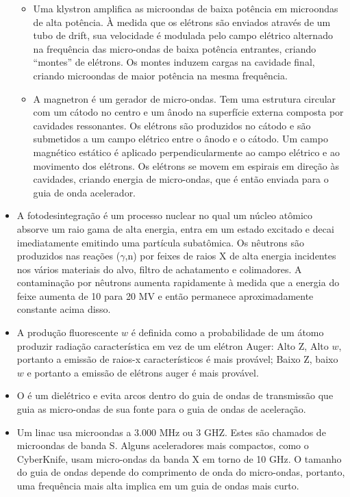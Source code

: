 \documentclass[11pt,a4paper]{article}
\newcounter{exemplo}
\begin{document}
\begin{exemplo}[Física]
\begin{itemize}
            \begin{itemize}
                \item Uma klystron amplifica as microondas de baixa potência em microondas de alta potência. À medida que os elétrons são enviados através de um tubo de drift, sua velocidade é modulada pelo campo elétrico alternado na frequência das micro-ondas de baixa potência entrantes, criando “montes” de elétrons. Os montes induzem cargas na cavidade final, criando microondas de maior potência na mesma frequência.
                
                \item A magnetron é um gerador de micro-ondas. Tem uma estrutura circular com um cátodo no centro e um ânodo na superfície externa composta por cavidades ressonantes. Os elétrons são produzidos no cátodo e são submetidos a um campo elétrico entre o ânodo e o cátodo. Um campo magnético estático é aplicado perpendicularmente ao campo elétrico e ao movimento dos elétrons. Os elétrons se movem em espirais em direção às cavidades, criando energia de micro-ondas, que é então enviada para o guia de onda acelerador.
            \end{itemize}
        
        \item A fotodesintegração é um processo nuclear no qual um núcleo atômico absorve um raio gama de alta energia, entra em um estado excitado e decai imediatamente emitindo uma partícula subatômica. Os nêutrons são produzidos nas reações ($\gamma$,n) por feixes de raios X de alta energia incidentes nos vários materiais do alvo, filtro de achatamento e colimadores. A contaminação por nêutrons aumenta rapidamente à medida que a energia do feixe aumenta de 10 para 20 MV e então permanece aproximadamente constante acima disso.
        
        \item A produção fluorescente $w$ é definida como a probabilidade de um átomo produzir radiação característica em vez de um elétron Auger: Alto Z, Alto $w$, portanto a emissão de raios-x característicos é mais provável; Baixo Z, baixo $w$ e portanto a emissão de elétrons auger é mais provável. 
        
        \item O  é um dielétrico e evita arcos dentro do guia de ondas de transmissão que guia as micro-ondas de sua fonte para o guia de ondas de aceleração.
        
        \item Um linac usa microondas a 3.000 MHz ou 3 GHZ. Estes são chamados de microondas de banda S. Alguns aceleradores mais compactos, como o CyberKnife, usam micro-ondas da banda X em torno de 10 GHz. O tamanho do guia de ondas depende do comprimento de onda do micro-ondas, portanto, uma frequência mais alta implica em um guia de ondas mais curto.
        

\end{itemize}
\end{exemplo}
\end{document}
